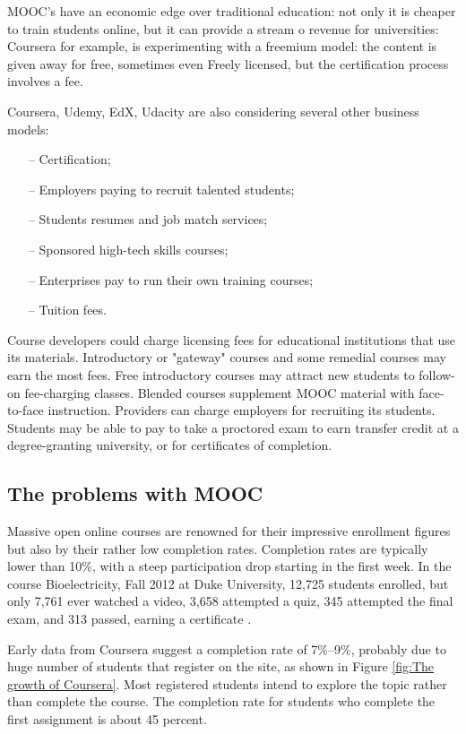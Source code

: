 MOOC's have an economic edge over traditional education: not only it is cheaper
to train students online, but it can provide a stream o revenue for
universities: Coursera for example, is experimenting with a freemium model: the
content is given away for free, sometimes even Freely licensed, but the
certification process involves a fee.

Coursera, Udemy, EdX, Udacity are also considering several other business models:
\begin{enumerate}[topsep=5pt, partopsep=0pt,itemsep=3pt,parsep=1pt]
    \item[--] Certification;
    \item[--] Employers paying to recruit talented students;
    \item[--] Students resumes and job match services;
    \item[--] Sponsored high-tech skills courses;
    \item[--] Enterprises pay to run their own training courses;
    \item[--] Tuition fees.
\end{enumerate}

Course developers could charge licensing fees for educational institutions that
use its materials. Introductory or "gateway" courses and some remedial courses
may earn the most fees. Free introductory courses may attract new students to
follow-on fee-charging classes. Blended courses supplement MOOC material with
face-to-face instruction. Providers can charge employers for recruiting its
students. Students may be able to pay to take a proctored exam to earn transfer
credit at a degree-granting university, or for certificates of completion.

\subsection{The problems with MOOC}
Massive open online courses are renowned for their impressive enrollment figures but also
by their rather low completion rates.
Completion rates are typically lower than 10\%, with a steep participation drop
starting in the first week. In the course Bioelectricity, Fall 2012 at Duke
University, 12,725 students enrolled, but only 7,761 ever watched a video, 3,658
attempted a quiz, 345 attempted the final exam, and 313 passed, earning a
certificate \citep{mooc_completion_rates}.

Early data from Coursera suggest a completion rate of 7\%–9\%, probably due to
huge number of students that register on the site, as shown in Figure \ref{fig:The growth of Coursera}.
Most registered students intend to explore the topic rather than complete the
course. The completion rate for students who complete the first assignment is about 45 percent.

